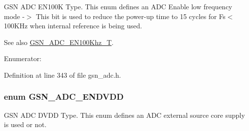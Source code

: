 GSN ADC EN100K Type. This enum defines an ADC Enable low frequency mode -\/$>$ This bit is used to reduce the power-\/up time to 15 cycles for Fs$<$100KHz when internal reference is being used. 

\begin{DoxySeeAlso}{See also}
\hyperlink{a00643_gacdca24ad9324635589139ad12ce67090}{GSN\_\-ADC\_\-EN100Khz\_\-T}. 
\end{DoxySeeAlso}
\begin{Desc}
\item[Enumerator: ]\par
\begin{description}
\item[{\em 
\hypertarget{a00643_gga35058132ca643890ae11c73b8a157dcba872d9cbb58db19da770013c1c7859ac3}{
GSN\_\-ADC\_\-EN100K\_\-DISABLE}
\label{a00643_gga35058132ca643890ae11c73b8a157dcba872d9cbb58db19da770013c1c7859ac3}
}]\item[{\em 
\hypertarget{a00643_gga35058132ca643890ae11c73b8a157dcbae3bad7e5407e3d785b7fbabac512bba0}{
GSN\_\-ADC\_\-EN100K\_\-ENABLE}
\label{a00643_gga35058132ca643890ae11c73b8a157dcbae3bad7e5407e3d785b7fbabac512bba0}
}]\end{description}
\end{Desc}



Definition at line 343 of file gsn\_\-adc.h.

\hypertarget{a00643_gae153aad95b81d706fe521df66b313c27}{
\subsubsection[{GSN\_\-ADC\_\-ENDVDD}]{\setlength{\rightskip}{0pt plus 5cm}enum {\bf GSN\_\-ADC\_\-ENDVDD}}}
\label{a00643_gae153aad95b81d706fe521df66b313c27}


GSN ADC DVDD Type. This enum defines an ADC external source core supply is used or not. 

